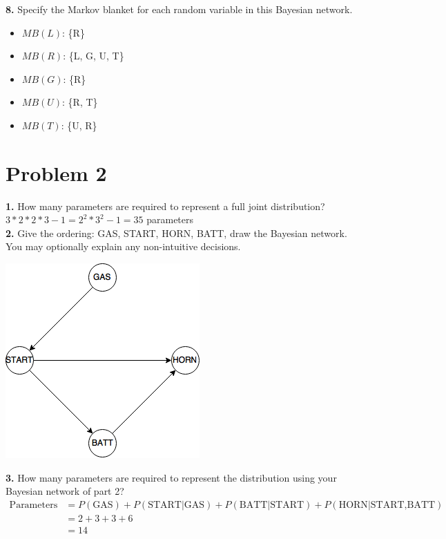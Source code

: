 \documentclass[titlepage]{article}
\begin{document}
\noindent \textbf{8. } Specify the Markov blanket for each random variable in this Bayesian network.\\
\begin{itemize}
	\item $MB(L)$: \{R\}
	\item $MB(R)$: \{L, G, U, T\}
	\item $MB(G)$: \{R\}
	\item $MB(U)$: \{R, T\}
	\item $MB(T)$: \{U, R\}
\end{itemize}


\pagebreak

\section*{Problem 2}

\noindent \textbf{1. } How many parameters are required to represent a full joint distribution?\\

$3 * 2 * 2 * 3 - 1 = 2^2 * 3^2 - 1= 35$ parameters\\

\noindent \textbf{2. } Give the ordering: GAS, START, HORN, BATT, draw the Bayesian network. You may optionally explain any non-intuitive decisions.\\

\centerline{\includegraphics[scale=0.5]{22.png}}

\noindent \textbf{3. } How many parameters are required to represent the distribution using your Bayesian network of part 2?\\

\begin{equation*}
\begin{aligned}
\text{Parameters} &= P(\text{GAS})+P(\text{START$|$GAS})+P(\text{BATT$|$START})+P(\text{HORN$|$START,BATT})\\
				  &= 2+3+3+6\\
				  &= 14
\end{aligned}
\end{equation*}
\end{document}

